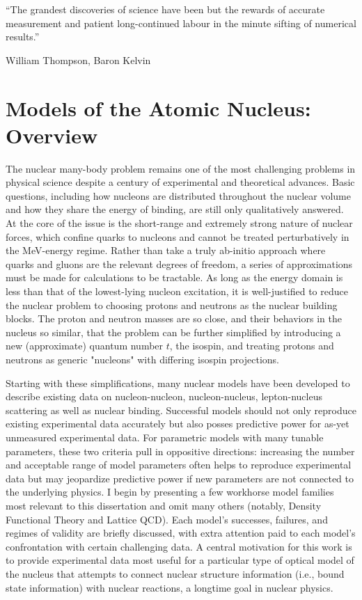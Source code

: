 \epigraph{``The grandest discoveries of science have been but the rewards of
    accurate measurement and patient long-continued labour in the minute
sifting of numerical results.''}{William Thompson,  Baron Kelvin}

\section{Models of the Atomic Nucleus: Overview}
The nuclear many-body problem remains one of the most challenging problems in
physical science despite a century of experimental and theoretical advances.
Basic questions, including how nucleons are distributed throughout the nuclear
volume and how they share the energy of binding, are still only qualitatively
answered. At the core of the issue is the short-range and extremely strong
nature of nuclear forces, which confine
quarks to nucleons and cannot be treated perturbatively in the MeV-energy regime.
Rather than take a truly ab-initio approach where quarks and gluons
are the relevant degrees of freedom, a series of approximations must be made
for calculations to be tractable. As long as the energy domain is less than that
of the lowest-lying nucleon excitation, it is well-justified to reduce the
nuclear problem to choosing protons and neutrons as the nuclear building blocks.
The proton and neutron masses are so close, and their behaviors in the nucleus so similar,
that the problem can be further simplified by introducing a new (approximate) quantum number
$t$, the isospin, and treating protons and neutrons as generic "nucleons" with differing isospin
projections.

Starting with these simplifications, many nuclear models have been developed to describe existing 
data on nucleon-nucleon, nucleon-nucleus, lepton-nucleus scattering as well as
nuclear binding. Successful models should not only reproduce existing
experimental data accurately but also posses predictive power for as-yet unmeasured
experimental data. For parametric models
with many tunable parameters, these two criteria pull in oppositive directions:
increasing the number
and acceptable range of model parameters often helps to reproduce experimental data but may
jeopardize predictive power if new parameters are not connected to the underlying physics.
I begin by presenting a few workhorse model families most relevant
to this dissertation and omit many others (notably, Density Functional Theory
and Lattice QCD). Each model's successes,
failures, and regimes of validity are briefly discussed, with extra attention paid
to each model's confrontation with certain challenging data.
A central motivation for this work is to provide experimental data most useful
for a particular type of optical model of the nucleus that attempts to
connect nuclear structure information (i.e., bound state information) with nuclear
reactions, a longtime goal in nuclear physics. 

